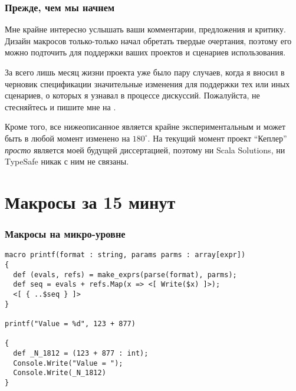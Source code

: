 \documentclass[hyperref={bookmarks=false}]{beamer}
\begin{document}
\begin{frame}[t]
\frametitle{Прежде, чем мы начнем}

Мне крайне интересно услышать ваши комментарии, предложения и критику. Дизайн макросов только-только начал обретать твердые очертания, поэтому его можно подточить для поддержки ваших проектов и сценариев использования.

За всего лишь месяц жизни проекта уже было пару случаев, когда я вносил в черновик спецификации значительные изменения для поддержки тех или иных сценариев, о которых я узнавал в процессе дискуссий. Пожалуйста, не стесняйтесь и пишите мне на .

Кроме того, все нижеописанное является крайне экспериментальным и может быть в любой момент изменено на $180^{\circ}$. На текущий момент проект ``Кеплер'' \emph{просто} является моей будущей диссертацией, поэтому ни Scala Solutions, ни TypeSafe никак с ним не связаны.
\end{frame}

\section{Макросы за 15 минут}

\begin{frame}[t, fragile]
\frametitle{Макросы на микро-уровне}

\begin{lstlisting}[language=nemerle]
macro printf(format : string, params parms : array[expr]) 
{ 
  def (evals, refs) = make_exprs(parse(format), parms); 
  def seq = evals + refs.Map(x => <[ Write($x) ]>); 
  <[ { ..$seq } ]> 
} 
 
printf("Value = %d", 123 + 877) 
 
{ 
  def _N_1812 = (123 + 877 : int); 
  Console.Write("Value = "); 
  Console.Write(_N_1812) 
} 
\end{lstlisting}

\end{frame}
\end{document}
